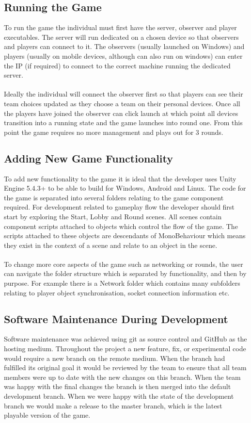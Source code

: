 \documentclass[11pt,a4paper]{article}
\begin{document}
 \subsection{Running the Game}
 To run the game the individual must first have the server, observer and player executables. The server will run dedicated on a chosen device so that observers and players can connect to it. The observers (usually launched on Windows)  and players (usually on mobile devices, although can also run on windows) can enter the IP (if required) to connect to the correct machine running the dedicated server. \\ \\
 Ideally the individual will connect the observer first so that players can see their team choices updated as they choose a team on their personal devices. Once all the players have joined the observer can click launch at which point all devices transition into a running state and the game launches into round one. From this point the game requires no more management and plays out for 3 rounds.

 \subsection{Adding New Game Functionality}
 To add new functionality to the game it is ideal that the developer uses Unity Engine 5.4.3+ to be able to build for Windows, Android and Linux. The code for the game is separated into several folders relating to the game component required. For development related to gameplay flow the developer should first start by exploring the Start, Lobby and Round scenes. All scenes contain component scripts attached to objects which control the flow of the game. The scripts attached to these objects are descendants of MonoBehaviour which means they exist in the context of a scene and relate to an object in the scene.\\ \\
 To change more core aspects of the game such as networking or rounds, the user can navigate the folder structure which is separated by functionality, and then by purpose. For example there is a Network folder which contains many subfolders relating to player object synchronisation, socket connection information etc.

 \subsection{Software Maintenance During Development}
 Software maintenance was achieved using git as source control and GitHub as the hosting medium. Throughout the project a new feature, fix, or experimental code would require a new branch on the remote medium. When the branch had fulfilled its original goal it would be reviewed by the team to ensure that all team members were up to date with the new changes on this branch. When the team was happy with the final changes the branch is then merged into the default development branch. When we were happy with the state of the development branch we would make a release to the master branch, which is the latest playable version of the game.
\end{document}
